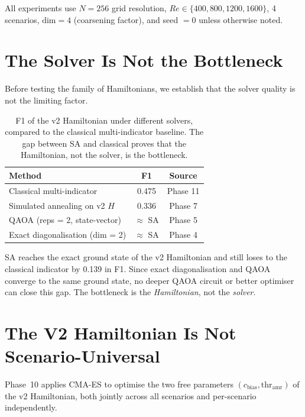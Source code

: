 \documentclass[12pt, a4paper, oneside]{report}
\begin{document}
All experiments use $N = 256$ grid resolution, $Re \in \{400, 800, 1200, 1600\}$, 4 scenarios, $\text{dim} = 4$ (coarsening factor), and seed $= 0$ unless otherwise noted.

\section{The Solver Is Not the Bottleneck}
\label{sec:solver-bottleneck}

Before testing the family of Hamiltonians, we establish that the solver quality is not the limiting factor.

\begin{table}[H]
\centering
\caption{F1 of the v2 Hamiltonian under different solvers, compared to the classical multi-indicator baseline. The gap between SA and classical proves that the Hamiltonian, not the solver, is the bottleneck.}
\label{tab:solver-comparison}
\begin{tabular}{lcc}
\toprule
\textbf{Method} & \textbf{F1} & \textbf{Source} \\
\midrule
Classical multi-indicator & 0.475 & Phase 11 \\
Simulated annealing on v2 $H$ & 0.336 & Phase 7 \\
QAOA (reps = 2, state-vector) & $\approx$ SA & Phase 5 \\
Exact diagonalisation (dim = 2) & $\approx$ SA & Phase 4 \\
\bottomrule
\end{tabular}
\end{table}

SA reaches the exact ground state of the v2 Hamiltonian and still loses to the classical indicator by 0.139 in F1. Since exact diagonalisation and QAOA converge to the same ground state, no deeper QAOA circuit or better optimiser can close this gap. The bottleneck is the \textit{Hamiltonian}, not the \textit{solver}.

\section{The V2 Hamiltonian Is Not Scenario-Universal}
\label{sec:cmaes-universality}

Phase~10 applies CMA-ES to optimise the two free parameters $(c_\text{bias}, \text{thr}_\text{amr})$ of the v2 Hamiltonian, both jointly across all scenarios and per-scenario independently.
\end{document}
